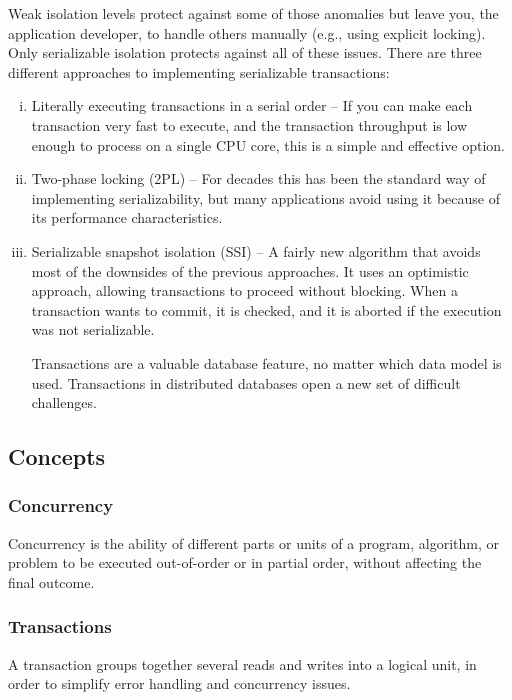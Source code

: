 \documentclass{article}
\begin{document}
    Weak isolation levels protect against some of those anomalies but leave you, the application developer, to handle others manually (e.g., using explicit locking). Only serializable isolation protects against all of these issues. There are three different approaches to implementing serializable transactions:
    
    \begin{enumerate}[i.]
        \item Literally executing transactions in a serial order -- If you can make each transaction very fast to execute, and the transaction throughput is low enough to process on a single CPU core, this is a simple and effective option.
        
        \item  Two-phase locking (2PL) --  For decades this has been the standard way of implementing serializability, but  many applications avoid using it because of its performance characteristics.
        
        \item Serializable snapshot isolation (SSI) -- A fairly new algorithm that avoids most of the downsides of the previous approaches. It uses an optimistic approach, allowing transactions to proceed without blocking. When a transaction wants to commit, it is checked, and it is aborted if the execution was not serializable.
        
        Transactions are a valuable database feature, no matter which data model is used. Transactions in distributed databases open a new set of difficult challenges.
    \end{enumerate}
    
    \subsection{Concepts}
    \subsubsection{Concurrency}
    Concurrency is the ability of different parts or units of a program, algorithm, or problem to be executed out-of-order or in partial order, without affecting the final outcome.
    
    \subsubsection{Transactions}
    A transaction groups together several reads and writes into a logical unit, in order to simplify error handling and concurrency issues.
    
\end{document}

